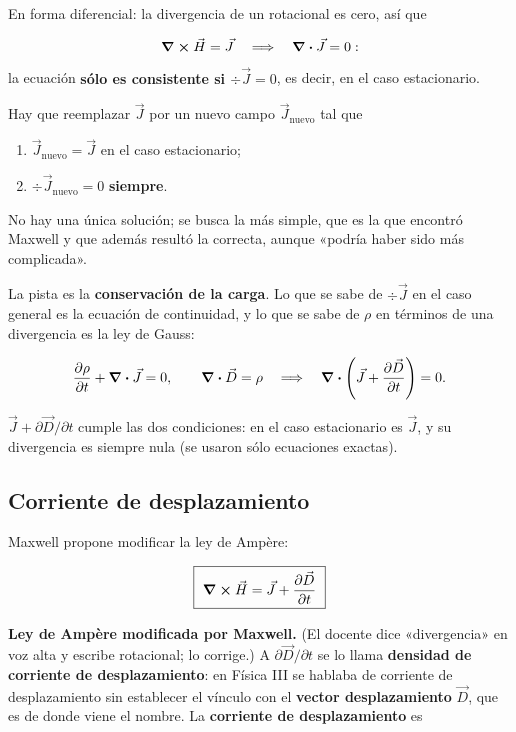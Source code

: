 \documentclass[12pt,a4paper]{article}
\begin{document}
En forma diferencial: la divergencia de un rotacional es cero, así que

\[
\curl\vec H = \vec J
\quad\Longrightarrow\quad
\div\vec J = 0 :
\]
la ecuación \textbf{sólo es consistente si $\div\vec J = 0$}, es decir, en el caso
estacionario.

Hay que reemplazar $\vec J$ por un nuevo campo $\vec J_{\text{nuevo}}$ tal que

\begin{enumerate}
  \item $\vec J_{\text{nuevo}} = \vec J$ en el caso estacionario;
  \item $\div\vec J_{\text{nuevo}} = 0$ \textbf{siempre}.
\end{enumerate}

No hay una única solución; se busca la más simple, que es la que encontró
Maxwell y que además resultó la correcta, aunque «podría haber sido más
complicada».

La pista es la \textbf{conservación de la carga}. Lo que se sabe de $\div\vec J$ en
el caso general es la ecuación de continuidad, y lo que se sabe de $\rho$ en
términos de una divergencia es la ley de Gauss:

\[
\pdv{\rho}{t} + \div\vec J = 0,
\qquad
\div\vec D = \rho
\quad\Longrightarrow\quad
\div\left(\vec J + \pdv{\vec D}{t}\right) = 0 .
\]

$\vec J + \partial\vec D/\partial t$ cumple las dos condiciones: en el caso
estacionario es $\vec J$, y su divergencia es siempre nula (se usaron sólo
ecuaciones exactas).

\subsection{Corriente de desplazamiento}

Maxwell propone modificar la ley de Ampère:

\begin{keybox}
\[
\boxed{\ \curl\vec H = \vec J + \pdv{\vec D}{t}\ }
\]
\end{keybox}

\textbf{Ley de Ampère modificada por Maxwell.} (El docente dice «divergencia» en voz
alta y escribe rotacional; lo corrige.) A $\partial\vec D/\partial t$ se lo llama
\textbf{densidad de corriente de desplazamiento}: en Física III se hablaba de
corriente de desplazamiento sin establecer el vínculo con el \textbf{vector
desplazamiento} $\vec D$, que es de donde viene el nombre. La \textbf{corriente de
desplazamiento} es
\end{document}
